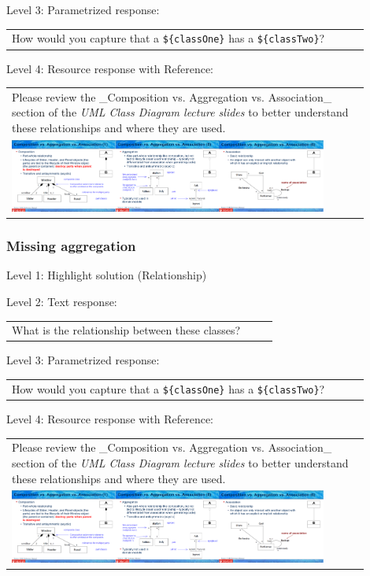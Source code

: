 \noindent Level 3: Parametrized response: \medskip

\begin{tabular}{|p{0.9\linewidth}}
How would you capture that a \verb|${classOne}| has a \verb|${classTwo}|?
\end{tabular} \medskip

\noindent Level 4: Resource response with Reference: \medskip

\begin{tabular}{|p{0.9\linewidth}}
Please review the _Composition vs. Aggregation vs. Association_ section of 
the \textit{UML Class Diagram lecture slides} to 
better understand these relationships and where they are used.

\\
\includegraphics[width=0.9\textwidth]{images/composition_aggregation_association.png}
\end{tabular} \medskip


\subsubsection{Missing aggregation}

\noindent Level 1: Highlight solution (Relationship) \medskip

\noindent Level 2: Text response: \medskip

\begin{tabular}{|p{0.9\linewidth}}
What is the relationship between these classes?
\end{tabular} \medskip

\noindent Level 3: Parametrized response: \medskip

\begin{tabular}{|p{0.9\linewidth}}
How would you capture that a \verb|${classOne}| has a \verb|${classTwo}|?
\end{tabular} \medskip

\noindent Level 4: Resource response with Reference: \medskip

\begin{tabular}{|p{0.9\linewidth}}
Please review the _Composition vs. Aggregation vs. Association_ section of 
the \textit{UML Class Diagram lecture slides} to 
better understand these relationships and where they are used.

\\
\includegraphics[width=0.9\textwidth]{images/composition_aggregation_association.png}
\end{tabular} \medskip


